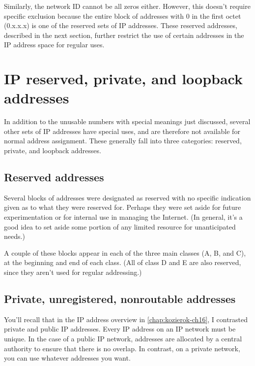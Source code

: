 Similarly, the network ID cannot be all zeros either. However, this
doesn't require specific exclusion because the entire block of addresses
with 0 in the first octet (0.x.x.x) is one of the reserved sets of
\protect\hypertarget{ch17s04.htmlux5cux23idx-CHP-17-0699}{}{}IP
addresses. These reserved addresses, described in the next section,
further restrict the use of certain addresses in the IP address space
for regular uses.



\section{IP reserved, private, and loopback addresses}

In addition to the unusable numbers with special meanings just
discussed, several other sets of IP addresses have special uses, and are
therefore not available for normal address assignment. These generally
fall into three categories: reserved, private, and loopback addresses.

\subsection{Reserved addresses}

Several blocks of addresses were designated as reserved with no specific
indication given as to what they were reserved for. Perhaps they were
set aside for future experimentation or for internal use in managing the
Internet. (In general, it's a good idea to set aside some portion of any
\protect\hypertarget{ch17s05.htmlux5cux23idx-CHP-17-0700}{}{}limited
resource for unanticipated needs.)

A couple of these blocks appear in each of the three main classes (A, B,
and C), at the beginning and end of each class. (All of class D and E
are also reserved, since they aren't used for regular addressing.)



\subsection{Private, unregistered, nonroutable addresses}

You'll recall that in the IP address overview in \vref{chap:kozierok-ch16}, I contrasted private and
public IP addresses. Every IP address on an IP network must be unique.
In the case of a public IP network, addresses are allocated by a central
authority to ensure that there is no overlap. In contrast, on a private
network, you can use whatever addresses you want.

